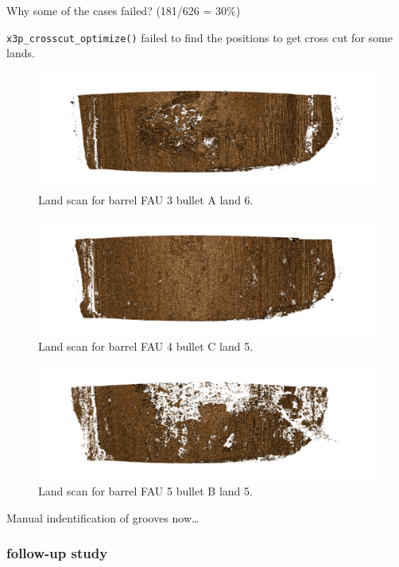 \documentclass[]{book}
\begin{document}
Why some of the cases failed? (181/626 = 30\%)

\texttt{x3p\_crosscut\_optimize()} failed to find the positions to get cross cut for some lands.

\begin{figure}

{\centering \includegraphics[width=0.5\linewidth]{images/yawei/lapd-FAU-3-Bullet-A-land-6} 

}

\caption{Land scan for barrel FAU 3 bullet A land 6.}\label{fig:unnamed-chunk-5}
\end{figure}

\begin{figure}

{\centering \includegraphics[width=0.5\linewidth]{images/yawei/lapd-FAU-4-Bullet-C-land-5} 

}

\caption{Land scan for barrel FAU 4 bullet C land 5.}\label{fig:unnamed-chunk-6}
\end{figure}

\begin{figure}

{\centering \includegraphics[width=0.5\linewidth]{images/yawei/lapd-FAU-5-Bullet-B-land-5} 

}

\caption{Land scan for barrel FAU 5 bullet B land 5.}\label{fig:unnamed-chunk-7}
\end{figure}

Manual indentification of grooves now\ldots{}

\hypertarget{follow-up-study}{%
\subsubsection{follow-up study}\label{follow-up-study}}
\end{document}
